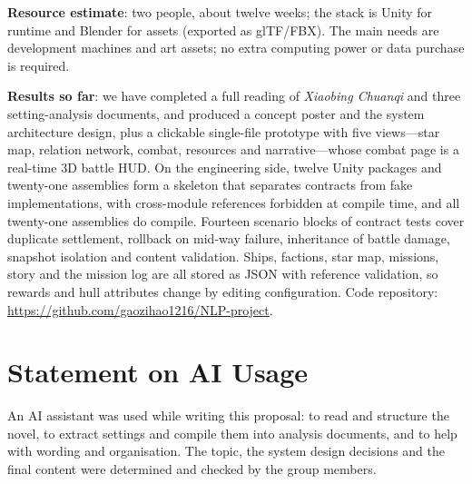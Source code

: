 \documentclass[11pt,a4paper]{article}
\begin{document}
\textbf{Resource estimate}: two people, about twelve weeks; the stack is Unity for runtime and
Blender for assets (exported as glTF/FBX). The main needs are development machines and art assets;
no extra computing power or data purchase is required.

\textbf{Results so far}: we have completed a full reading of \textit{Xiaobing Chuanqi} and three
setting-analysis documents, and produced a concept poster and the system architecture design, plus a
clickable single-file prototype with five views---star map, relation network, combat, resources and
narrative---whose combat page is a real-time 3D battle HUD. On the engineering side, twelve Unity
packages and twenty-one assemblies form a skeleton that separates contracts from fake implementations,
with cross-module references forbidden at compile time, and all twenty-one assemblies do compile.
Fourteen scenario blocks of contract tests cover duplicate settlement, rollback on mid-way failure,
inheritance of battle damage, snapshot isolation and content validation. Ships, factions, star map,
missions, story and the mission log are all stored as JSON with reference validation, so rewards and
hull attributes change by editing configuration. Code repository:
\url{https://github.com/gaozihao1216/NLP-project}.

\section{Statement on AI Usage}
An AI assistant was used while writing this proposal: to read and structure the novel, to extract
settings and compile them into analysis documents, and to help with wording and organisation.
The topic, the system design decisions and the final content were determined and checked by the
group members.
\end{document}
